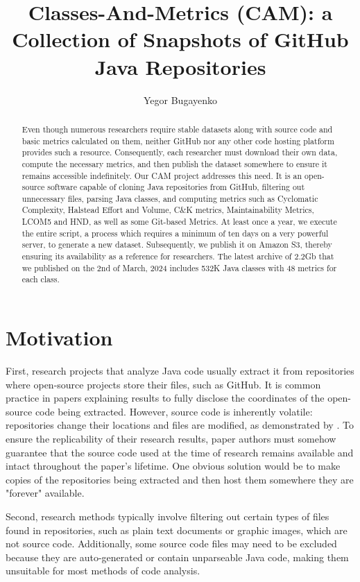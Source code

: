 \documentclass[11pt,sigplan,nonacm]{acmart}
\title{Classes-And-Metrics (CAM): a Collection of Snapshots of GitHub Java Repositories}
\author{Yegor Bugayenko}
\affiliation{\institution{Huawei, Russia, Moscow}\city{}\country{}}
\newcommand\cam{{\sffamily CAM}}
\begin{document}
\begin{abstract}
Even though numerous researchers require stable datasets along with source code and basic metrics calculated on them, neither GitHub nor any other code hosting platform provides such a resource. Consequently, each researcher must download their own data, compute the necessary metrics, and then publish the dataset somewhere to ensure it remains accessible indefinitely. Our \cam{} project addresses this need. It is an open-source software capable of cloning Java repositories from GitHub, filtering out unnecessary files, parsing Java classes, and computing metrics such as Cyclomatic Complexity, Halstead Effort and Volume, C\&K metrics, Maintainability Metrics, LCOM5 and HND, as well as some Git-based Metrics. At least once a year, we execute the entire script, a process which requires a minimum of ten days on a very powerful server, to generate a new dataset. Subsequently, we publish it on Amazon S3, thereby ensuring its availability as a reference for researchers. The latest archive of 2.2Gb that we published on the 2nd of March, 2024 includes 532K Java classes with 48 metrics for each class.
\end{abstract}

\maketitle

\section{Motivation}

First, research projects that analyze Java code usually extract it from repositories where open-source projects store their files, such as GitHub. It is common practice in papers explaining results to fully disclose the coordinates of the open-source code being extracted. However, source code is inherently volatile: repositories change their locations and files are modified, as demonstrated by \citet{5463348}. To ensure the replicability of their research results, paper authors must somehow guarantee that the source code used at the time of research remains available and intact throughout the paper's lifetime. One obvious solution would be to make copies of the repositories being extracted and then host them somewhere they are "forever" available.

Second, research methods typically involve filtering out certain types of files found in repositories, such as plain text documents or graphic images, which are not source code. Additionally, some source code files may need to be excluded because they are auto-generated or contain unparseable Java code, making them unsuitable for most methods of code analysis.
\end{document}
